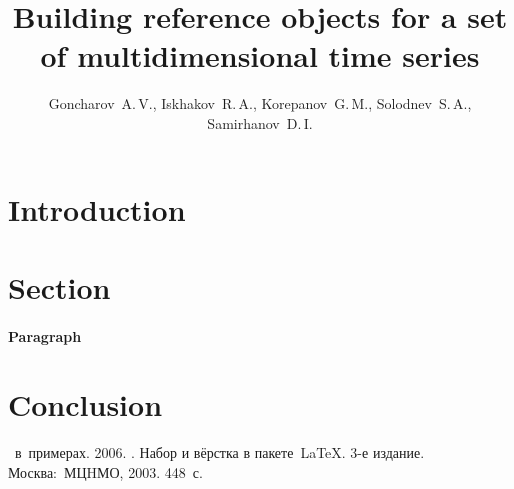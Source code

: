 \documentclass[12pt,twoside]{article}
\title
        {Building reference objects for a set of multidimensional time series}
\author
        {Goncharov~A.\,V., Iskhakov~R.\,A., Korepanov~G.\,M., Solodnev~S.\,A., Samirhanov~D.\,I.} %
\begin{document}
    \maketitle
    \section{Introduction}
    \section{Section}
    \paragraph{Paragraph}
    \section{Conclusion}

    
    

    \begin{thebibliography}{1}
       \LaTeXe\ в~примерах.
       2006.
       .
        Набор и вёрстка в пакете~\LaTeX.
       3-е издание.
       Москва:~МЦHМО, 2003.  448~с.
    \end{thebibliography}
    
    
\end{document}
